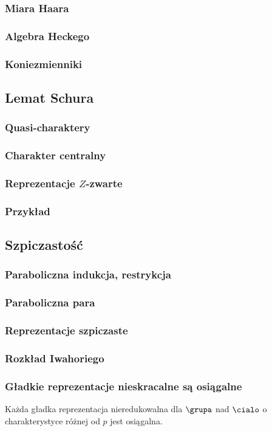 \subsubsection{Miara Haara}

\subsubsection{Algebra Heckego}

\subsubsection{Koniezmienniki}

\subsection{Lemat Schura}
\subsubsection{Quasi-charaktery}
\subsubsection{Charakter centralny}
\subsubsection{Reprezentacje $Z$-zwarte}
\subsubsection{Przykład}

\subsection{Szpiczastość}
\subsubsection{Paraboliczna indukcja, restrykcja}
\subsubsection{Paraboliczna para}
\subsubsection{Reprezentacje szpiczaste}
\subsubsection{Rozkład Iwahoriego}
\subsubsection{Gładkie reprezentacje nieskracalne są osiągalne}

\begin{twierdzenie}[Vigneras, 2005]
	Każda gładka reprezentacja nieredukowalna dla $\grupa$ nad $\cialo$ o charakterystyce różnej od $p$ jest osiągalna.
\end{twierdzenie}